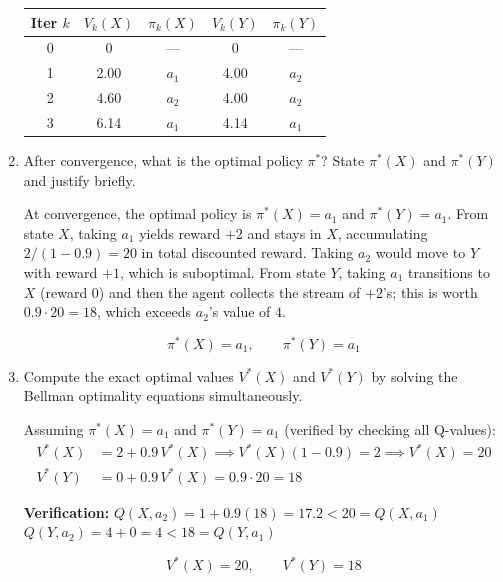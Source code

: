 \documentclass[12pt]{article}
\begin{document}
\begin{enumerate}[label=(\alph*)]
\begin{resultsbox}
\begin{center}
\begin{tabular}{ccccc}
\toprule
\textbf{Iter $k$} & $V_k(X)$ & $\pi_k(X)$ & $V_k(Y)$ & $\pi_k(Y)$ \\
\midrule
0 & 0 & --- & 0 & --- \\[0.5em]
1 & 2.00 & $a_1$ & 4.00 & $a_2$ \\[0.5em]
2 & 4.60 & $a_2$ & 4.00 & $a_2$ \\[0.5em]
3 & 6.14 & $a_1$ & 4.14 & $a_1$ \\
\bottomrule
\end{tabular}
\end{center}
\end{resultsbox}

\item After convergence, what is the optimal policy $\pi^*$? State $\pi^*(X)$ and $\pi^*(Y)$ and justify briefly.

\begin{stepbox}[Solution 3(b)]
At convergence, the optimal policy is $\pi^*(X) = a_1$ and $\pi^*(Y) = a_1$. From state $X$, taking $a_1$ yields reward $+2$ and stays in $X$, accumulating $2/(1-0.9) = 20$ in total discounted reward. Taking $a_2$ would move to $Y$ with reward $+1$, which is suboptimal. From state $Y$, taking $a_1$ transitions to $X$ (reward 0) and then the agent collects the stream of $+2$'s; this is worth $0.9 \cdot 20 = 18$, which exceeds $a_2$'s value of $4$.
\end{stepbox}
\begin{resultsbox}
\[
\boxed{\pi^*(X) = a_1, \qquad \pi^*(Y) = a_1}
\]
\end{resultsbox}

\item Compute the exact optimal values $V^*(X)$ and $V^*(Y)$ by solving the Bellman optimality equations simultaneously.

\begin{stepbox}[Solution 3(c)]
Assuming $\pi^*(X) = a_1$ and $\pi^*(Y) = a_1$ (verified by checking all Q-values):
\begin{align*}
V^*(X) &= 2 + 0.9\,V^*(X) \implies V^*(X)(1 - 0.9) = 2 \implies V^*(X) = 20 \\
V^*(Y) &= 0 + 0.9\,V^*(X) = 0.9 \cdot 20 = 18
\end{align*}

\textbf{Verification:} $Q(X, a_2) = 1 + 0.9(18) = 17.2 < 20 = Q(X, a_1)$ \checkmark \\
$Q(Y, a_2) = 4 + 0 = 4 < 18 = Q(Y, a_1)$ \checkmark
\end{stepbox}
\begin{resultsbox}
\[
\boxed{V^*(X) = 20, \qquad V^*(Y) = 18}
\]
\end{resultsbox}

\end{enumerate}
\end{document}
